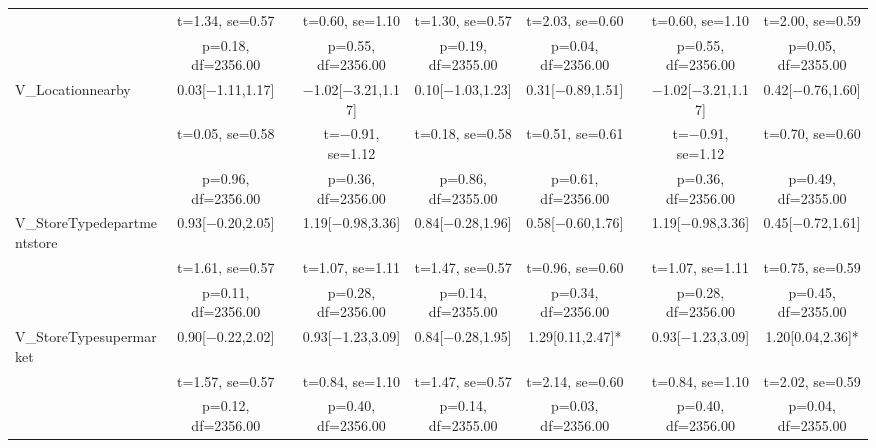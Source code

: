 \documentclass[]{report}
\begin{document}
\begin{table}
{\begin{tabular}[t]{lcccccccc}
		& t=\num{1.34}, se=\num{0.57} &  & t=\num{0.60}, se=\num{1.10} & t=\num{1.30}, se=\num{0.57} & t=\num{2.03}, se=\num{0.60} &  & t=\num{0.60}, se=\num{1.10} & t=\num{2.00}, se=\num{0.59}\\
		& p=\num{0.18}, df=\num{2356.00} &  & p=\num{0.55}, df=\num{2356.00} & p=\num{0.19}, df=\num{2355.00} & p=\num{0.04}, df=\num{2356.00} &  & p=\num{0.55}, df=\num{2356.00} & p=\num{0.05}, df=\num{2355.00}\\
		V\_Locationnearby & \num{0.03}[\num{-1.11},\num{1.17}] &  & \num{-1.02}[\num{-3.21},\num{1.17}] & \num{0.10}[\num{-1.03},\num{1.23}] & \num{0.31}[\num{-0.89},\num{1.51}] &  & \num{-1.02}[\num{-3.21},\num{1.17}] & \num{0.42}[\num{-0.76},\num{1.60}]\\
		& t=\num{0.05}, se=\num{0.58} &  & t=\num{-0.91}, se=\num{1.12} & t=\num{0.18}, se=\num{0.58} & t=\num{0.51}, se=\num{0.61} &  & t=\num{-0.91}, se=\num{1.12} & t=\num{0.70}, se=\num{0.60}\\
		& p=\num{0.96}, df=\num{2356.00} &  & p=\num{0.36}, df=\num{2356.00} & p=\num{0.86}, df=\num{2355.00} & p=\num{0.61}, df=\num{2356.00} &  & p=\num{0.36}, df=\num{2356.00} & p=\num{0.49}, df=\num{2355.00}\\
		V\_StoreTypedepartmentstore & \num{0.93}[\num{-0.20},\num{2.05}] &  & \num{1.19}[\num{-0.98},\num{3.36}] & \num{0.84}[\num{-0.28},\num{1.96}] & \num{0.58}[\num{-0.60},\num{1.76}] &  & \num{1.19}[\num{-0.98},\num{3.36}] & \num{0.45}[\num{-0.72},\num{1.61}]\\
		& t=\num{1.61}, se=\num{0.57} &  & t=\num{1.07}, se=\num{1.11} & t=\num{1.47}, se=\num{0.57} & t=\num{0.96}, se=\num{0.60} &  & t=\num{1.07}, se=\num{1.11} & t=\num{0.75}, se=\num{0.59}\\
		& p=\num{0.11}, df=\num{2356.00} &  & p=\num{0.28}, df=\num{2356.00} & p=\num{0.14}, df=\num{2355.00} & p=\num{0.34}, df=\num{2356.00} &  & p=\num{0.28}, df=\num{2356.00} & p=\num{0.45}, df=\num{2355.00}\\
		V\_StoreTypesupermarket & \num{0.90}[\num{-0.22},\num{2.02}] &  & \num{0.93}[\num{-1.23},\num{3.09}] & \num{0.84}[\num{-0.28},\num{1.95}] & \num{1.29}[\num{0.11},\num{2.47}]* &  & \num{0.93}[\num{-1.23},\num{3.09}] & \num{1.20}[\num{0.04},\num{2.36}]*\\
		& t=\num{1.57}, se=\num{0.57} &  & t=\num{0.84}, se=\num{1.10} & t=\num{1.47}, se=\num{0.57} & t=\num{2.14}, se=\num{0.60} &  & t=\num{0.84}, se=\num{1.10} & t=\num{2.02}, se=\num{0.59}\\
		& p=\num{0.12}, df=\num{2356.00} &  & p=\num{0.40}, df=\num{2356.00} & p=\num{0.14}, df=\num{2355.00} & p=\num{0.03}, df=\num{2356.00} &  & p=\num{0.40}, df=\num{2356.00} & p=\num{0.04}, df=\num{2355.00}\\

\end{tabular}}
\end{table}
\end{document}
